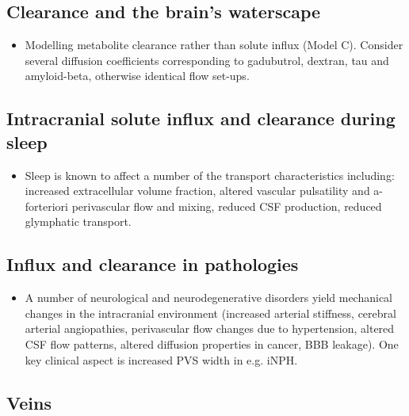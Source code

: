 \documentclass[fleqn,10pt]{wlscirep}
\newcommand{\draft}[1]{\textcolor{gray}{#1}}
\begin{document}
\draft{\lipsum[1]}

\subsection*{Clearance and the brain's waterscape}

\draft{\lipsum[1]}

\begin{itemize}
\item 
  Modelling metabolite clearance rather than solute influx (Model
  C). Consider several diffusion coefficients corresponding to
  gadubutrol, dextran, tau and amyloid-beta, otherwise identical flow
  set-ups.
\end{itemize}

\subsection*{Intracranial solute influx and clearance during sleep}

\begin{itemize}
\item
  Sleep is known to affect a number of the transport characteristics including: increased extracellular volume fraction, altered vascular pulsatility and a-forteriori perivascular flow and mixing, reduced CSF production, reduced glymphatic transport.
\end{itemize}

\draft{\lipsum[1]}

\subsection*{Influx and clearance in pathologies}

\begin{itemize}
\item
  A number of neurological and neurodegenerative disorders yield mechanical changes in the intracranial environment (increased arterial stiffness, cerebral arterial angiopathies, perivascular flow changes due to hypertension, altered CSF flow patterns, altered diffusion properties in cancer, BBB leakage). One key clinical aspect is increased PVS width in e.g. iNPH. 
\end{itemize}

\draft{\lipsum[1]}

\subsection*{Veins}
\end{document}
